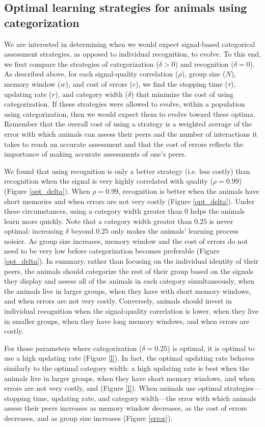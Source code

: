 \subsection*{Optimal learning strategies for animals using categorization}
We are interested in determining when we would expect signal-based categorical assessment strategies, as opposed to individual recognition, to evolve. To this end, we first compare the strategies of categorization ($\delta>0$) and recognition ($\delta=0$). As described above, for each signal-quality correlation ($\rho$), group size ($N$), memory window ($w$), and cost of errors ($c$), we find the stopping time ($\tau$), updating rate ($r$), and category width ($\delta$) that minimize the cost of using categorization. If these strategies were allowed to evolve, within a population using categorization, then we would expect them to evolve toward these optima. Remember that the overall cost of using a strategy is a weighted average of the error with which animals can assess their peers and the number of interactions it takes to reach an accurate assessment and that the cost of errors reflects the importance of making accurate assessments of one's peers. 

We found that using recognition is only a better strategy (i.e. less costly) than recognition when the signal is very highly correlated with quality ($\rho=0.99$) (Figure \ref{opt_delta}). When $\rho=0.99$, recognition is better when the animals have short memories and when errors are not very costly (Figure \ref{opt_delta}). Under these circumstances, using a category width greater than $0$ helps the animals learn more quickly. Note that a category width greater than $0.25$ is never optimal: increasing $\delta$ beyond $0.25$ only makes the animals' learning process noisier. As group size increases, memory window and the cost of errors do not need to be very low before categorization becomes preferable (Figure \ref{opt_delta}). In summary, rather than focusing on the individual identity of their peers, the animals should categorize the rest of their group based on the signals they display and assess all of the animals in each category simultaneously, when the animals live in larger groups, when they have with short memory windows, and when errors are not very costly. Conversely, animals should invest in individual recognition when the signal-quality correlation is lower, when they live in smaller groups, when they have long memory windows, and when errors are costly. 

For those parameters where categorization ($\delta=0.25$) is optimal, it is optimal to use a high updating rate (Figure \ref{l}). In fact, the optimal updating rate behaves similarly to the optimal category width: a high updating rate is best when the animals live in larger groups, when they have short memory windows, and when errors are not very costly, and  (Figure \ref{l}). When animals use optimal strategies---stopping time, updating rate, and category width---the error with which animals assess their peers increases as memory window decreases, as the cost of errors decreases, and as group size increases (Figure \ref{error}). 

